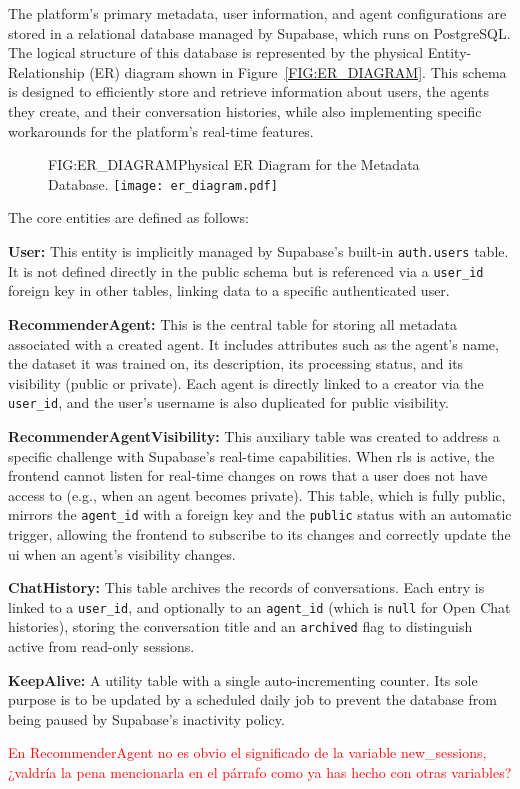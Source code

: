 The platform's primary metadata, user information, and agent configurations are stored in a relational database managed by Supabase, which runs on PostgreSQL. The logical structure of this database is represented by the physical Entity-Relationship (ER) diagram shown in Figure~\ref{FIG:ER_DIAGRAM}. This schema is designed to efficiently store and retrieve information about users, the agents they create, and their conversation histories, while also implementing specific workarounds for the platform's real-time features.

\begin{figure}[Physical ER Diagram]{FIG:ER_DIAGRAM}{Physical ER Diagram for the Metadata Database.}
    \centering
    \texttt{[image: er\_diagram.pdf]}
\end{figure}

The core entities are defined as follows:
\begin{compactitem}[\textbullet]
    \item \textbf{User:} This entity is implicitly managed by Supabase's built-in \texttt{auth.users} table. It is not defined directly in the public schema but is referenced via a \texttt{user\_id} foreign key in other tables, linking data to a specific authenticated user.
    \item \textbf{RecommenderAgent:} This is the central table for storing all metadata associated with a created agent. It includes attributes such as the agent's name, the dataset it was trained on, its description, its processing status, and its visibility (public or private). Each agent is directly linked to a creator via the \texttt{user\_id}, and the user's username is also duplicated for public visibility.
    \item \textbf{RecommenderAgentVisibility:} This auxiliary table was created to address a specific challenge with Supabase's real-time capabilities. When \acl{rls} is active, the frontend cannot listen for real-time changes on rows that a user does not have access to (e.g., when an agent becomes private). This table, which is fully public, mirrors the \texttt{agent\_id} with a foreign key and the \texttt{public} status with an automatic trigger, allowing the frontend to subscribe to its changes and correctly update the \acs{ui} when an agent's visibility changes.
    \item \textbf{ChatHistory:} This table archives the records of conversations. Each entry is linked to a \texttt{user\_id}, and optionally to an \texttt{agent\_id} (which is \texttt{null} for Open Chat histories), storing the conversation title and an \texttt{archived} flag to distinguish active from read-only sessions.
    \item \textbf{KeepAlive:} A utility table with a single auto-incrementing counter. Its sole purpose is to be updated by a scheduled daily job to prevent the database from being paused by Supabase's inactivity policy.
\end{compactitem}

\textcolor{red}{En RecommenderAgent no es obvio el significado de la variable new\_sessions, ¿valdría la pena mencionarla en el párrafo como ya has hecho con otras variables?}
